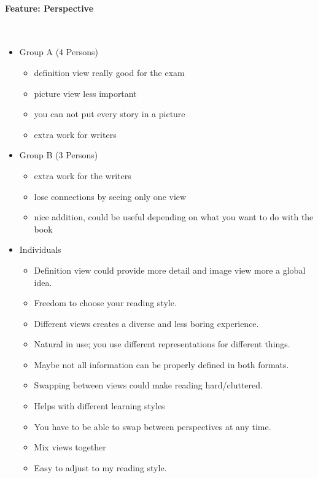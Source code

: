 \documentclass[main.tex]{subfiles}
\begin{document}
\paragraph{Feature: Perspective}~
\begin{itemize}
	\item Group A (4 Persons)
		\begin{itemize}
			\item definition view really good for the exam
			\item picture view less important
			\item you can not put every story in a picture
			\item extra work for writers
		\end{itemize}
	\item Group B (3 Persons)
		\begin{itemize}
			\item extra work for the writers
			\item lose connections by seeing only one view
			\item nice addition, could be useful depending on what you want to do with the book
		\end{itemize}
	\item Individuals
		\begin{itemize}
			\item Definition view could provide more detail and image view more a global idea.
			\item Freedom to choose your reading style.
			\item Different views creates a diverse and less boring experience.
			\item Natural in use; you use different representations for different things.
			\item Maybe not all information can be properly defined in both formats.
			\item Swapping between views could make reading hard/cluttered.
			\item Helps with different learning styles
			\item You have to be able to swap between perspectives at any time. 
			\item Mix views together
			\item Easy to adjust to my reading style.
		\end{itemize}
\end{itemize}
\end{document}
